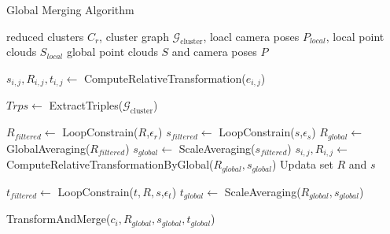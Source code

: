 \documentclass[runningheads]{llncs}
\begin{document}
\begin{algorithm}
\caption{Global Merging Algorithm}
\label{alg:global_merging}
\begin{algorithmic}[1]
\Require reduced clusters $C_r$, cluster graph $\mathcal{G}_{\text{cluster}}$, loacl camera poses $P_{local}$, local point clouds $S_{local}$ 
\Ensure global point clouds $S$ and camera poses $P$


    \State $s_{i,j},R_{i,j},t_{i,j} \gets$ ComputeRelativeTransformation($e_{i,j}$)  
\EndFor	   

\State $Trps \gets$ ExtractTriples($\mathcal{G}_{\text{cluster}}$)  

    \State $R_{filtered} \gets$ LoopConstrain($R$,$\epsilon_r$) 
    \State $s_{filtered} \gets$ LoopConstrain($s$,$\epsilon_s$) 
\EndFor	 
\State $R_{global} \gets$ GlobalAveraging($R_{filtered}$)
\State $s_{global} \gets$ ScaleAveraging($s_{filtered}$)
    \State $s_{i,j},R_{i,j} \gets$ ComputeRelativeTransformationByGlobal($R_{global},s_{global}$) 
    \State Updata set $R$ and $s$
\EndFor	 

    \State $t_{filtered} \gets$ LoopConstrain($t,R,s$,$\epsilon_t$) 
\EndFor	 
\State $t_{global} \gets$ ScaleAveraging($R_{global},s_{global}$)

    \State TransformAndMerge($c_i,R_{global},s_{global},t_{global}$)
\EndFor	


\end{algorithmic}
\end{algorithm}

%
%
\end{document}
